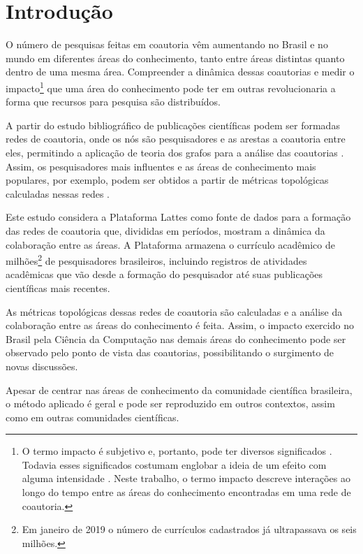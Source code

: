 \chapter[Introdução]{Introdução}

O número de pesquisas feitas em coautoria vêm aumentando no Brasil \cite{mena2014brazilian} e no mundo \cite{glanzel2003bibliometrics} em diferentes áreas do conhecimento, tanto entre áreas distintas quanto dentro de uma mesma área. Compreender a dinâmica dessas coautorias e medir o impacto\footnote{O termo impacto é subjetivo e, portanto, pode ter diversos significados \cite{roemer2015meaningful}. Todavia esses significados costumam englobar a ideia de um efeito com alguma intensidade \cite{roemer2015meaningful}. Neste trabalho, o termo impacto descreve interações ao longo do tempo entre as áreas do conhecimento encontradas em uma rede de coautoria.} que uma área do conhecimento pode ter em outras revolucionaria a forma que recursos para pesquisa são distribuídos.

A partir do estudo bibliográfico de publicações científicas podem ser formadas redes de coautoria, onde os nós são pesquisadores e as arestas a coautoria entre eles, permitindo a aplicação de teoria dos grafos para a análise das coautorias \cite{liu2005co}. Assim, os pesquisadores mais influentes e as áreas de conhecimento mais populares, por exemplo, podem ser obtidos a partir de métricas topológicas calculadas nessas redes \cite{franceschet2011collaboration}.

Este estudo considera a Plataforma Lattes como fonte de dados para a formação das redes de coautoria que, divididas em períodos, mostram a dinâmica da colaboração entre as áreas. A Plataforma armazena o currículo acadêmico de milhões\footnote{Em janeiro de 2019 o número de currículos cadastrados já ultrapassava os seis milhões.} de pesquisadores brasileiros, incluindo registros de atividades acadêmicas que vão desde a formação do pesquisador até suas publicações científicas mais recentes.

As métricas topológicas dessas redes de coautoria são calculadas e a análise da colaboração entre as áreas do conhecimento é feita. Assim, o impacto exercido no Brasil pela Ciência da Computação nas demais áreas do conhecimento pode ser observado pelo ponto de vista das coautorias, possibilitando o surgimento de novas discussões.

Apesar de centrar nas áreas de conhecimento da comunidade científica brasileira, o método aplicado é geral e pode ser reproduzido em outros contextos, assim como em outras comunidades científicas.

